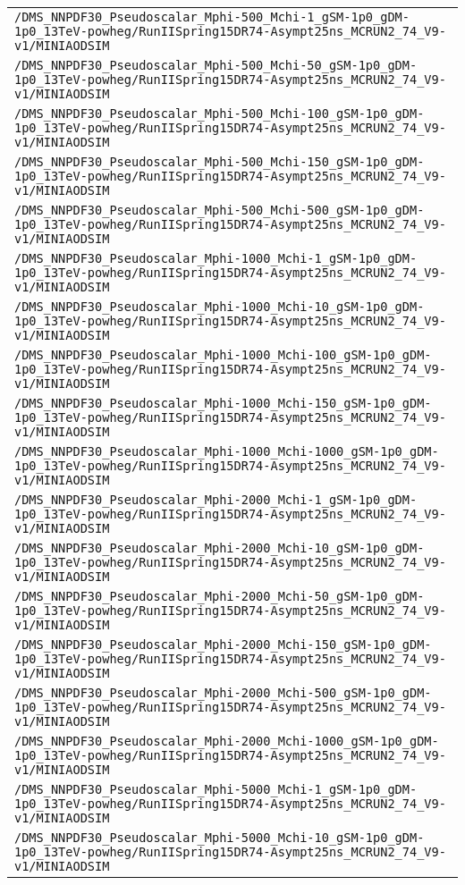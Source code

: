 \begin{center}
\begin{tabular}{l}
\verb!/DMS_NNPDF30_Pseudoscalar_Mphi-500_Mchi-1_gSM-1p0_gDM-1p0_13TeV-powheg/RunIISpring15DR74-Asympt25ns_MCRUN2_74_V9-v1/MINIAODSIM! \tabularnewline
\verb!/DMS_NNPDF30_Pseudoscalar_Mphi-500_Mchi-50_gSM-1p0_gDM-1p0_13TeV-powheg/RunIISpring15DR74-Asympt25ns_MCRUN2_74_V9-v1/MINIAODSIM! \tabularnewline
\verb!/DMS_NNPDF30_Pseudoscalar_Mphi-500_Mchi-100_gSM-1p0_gDM-1p0_13TeV-powheg/RunIISpring15DR74-Asympt25ns_MCRUN2_74_V9-v1/MINIAODSIM! \tabularnewline
\verb!/DMS_NNPDF30_Pseudoscalar_Mphi-500_Mchi-150_gSM-1p0_gDM-1p0_13TeV-powheg/RunIISpring15DR74-Asympt25ns_MCRUN2_74_V9-v1/MINIAODSIM! \tabularnewline
\verb!/DMS_NNPDF30_Pseudoscalar_Mphi-500_Mchi-500_gSM-1p0_gDM-1p0_13TeV-powheg/RunIISpring15DR74-Asympt25ns_MCRUN2_74_V9-v1/MINIAODSIM! \tabularnewline
\verb!/DMS_NNPDF30_Pseudoscalar_Mphi-1000_Mchi-1_gSM-1p0_gDM-1p0_13TeV-powheg/RunIISpring15DR74-Asympt25ns_MCRUN2_74_V9-v1/MINIAODSIM! \tabularnewline
\verb!/DMS_NNPDF30_Pseudoscalar_Mphi-1000_Mchi-10_gSM-1p0_gDM-1p0_13TeV-powheg/RunIISpring15DR74-Asympt25ns_MCRUN2_74_V9-v1/MINIAODSIM! \tabularnewline
\verb!/DMS_NNPDF30_Pseudoscalar_Mphi-1000_Mchi-100_gSM-1p0_gDM-1p0_13TeV-powheg/RunIISpring15DR74-Asympt25ns_MCRUN2_74_V9-v1/MINIAODSIM! \tabularnewline
\verb!/DMS_NNPDF30_Pseudoscalar_Mphi-1000_Mchi-150_gSM-1p0_gDM-1p0_13TeV-powheg/RunIISpring15DR74-Asympt25ns_MCRUN2_74_V9-v1/MINIAODSIM! \tabularnewline
\verb!/DMS_NNPDF30_Pseudoscalar_Mphi-1000_Mchi-1000_gSM-1p0_gDM-1p0_13TeV-powheg/RunIISpring15DR74-Asympt25ns_MCRUN2_74_V9-v1/MINIAODSIM! \tabularnewline
\verb!/DMS_NNPDF30_Pseudoscalar_Mphi-2000_Mchi-1_gSM-1p0_gDM-1p0_13TeV-powheg/RunIISpring15DR74-Asympt25ns_MCRUN2_74_V9-v1/MINIAODSIM! \tabularnewline
\verb!/DMS_NNPDF30_Pseudoscalar_Mphi-2000_Mchi-10_gSM-1p0_gDM-1p0_13TeV-powheg/RunIISpring15DR74-Asympt25ns_MCRUN2_74_V9-v1/MINIAODSIM! \tabularnewline
\verb!/DMS_NNPDF30_Pseudoscalar_Mphi-2000_Mchi-50_gSM-1p0_gDM-1p0_13TeV-powheg/RunIISpring15DR74-Asympt25ns_MCRUN2_74_V9-v1/MINIAODSIM! \tabularnewline
\verb!/DMS_NNPDF30_Pseudoscalar_Mphi-2000_Mchi-150_gSM-1p0_gDM-1p0_13TeV-powheg/RunIISpring15DR74-Asympt25ns_MCRUN2_74_V9-v1/MINIAODSIM! \tabularnewline
\verb!/DMS_NNPDF30_Pseudoscalar_Mphi-2000_Mchi-500_gSM-1p0_gDM-1p0_13TeV-powheg/RunIISpring15DR74-Asympt25ns_MCRUN2_74_V9-v1/MINIAODSIM! \tabularnewline
\verb!/DMS_NNPDF30_Pseudoscalar_Mphi-2000_Mchi-1000_gSM-1p0_gDM-1p0_13TeV-powheg/RunIISpring15DR74-Asympt25ns_MCRUN2_74_V9-v1/MINIAODSIM! \tabularnewline
\verb!/DMS_NNPDF30_Pseudoscalar_Mphi-5000_Mchi-1_gSM-1p0_gDM-1p0_13TeV-powheg/RunIISpring15DR74-Asympt25ns_MCRUN2_74_V9-v1/MINIAODSIM! \tabularnewline
\verb!/DMS_NNPDF30_Pseudoscalar_Mphi-5000_Mchi-10_gSM-1p0_gDM-1p0_13TeV-powheg/RunIISpring15DR74-Asympt25ns_MCRUN2_74_V9-v1/MINIAODSIM! \tabularnewline

\end{tabular}
\end{center}

